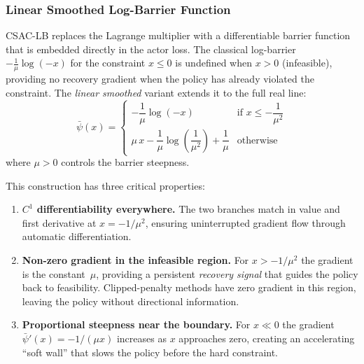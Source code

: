 \subsubsection{Linear Smoothed Log-Barrier Function}

CSAC-LB replaces the Lagrange multiplier with a differentiable barrier function
that is embedded directly in the actor loss.  The classical log-barrier
$-\frac{1}{\mu}\log(-x)$ for the constraint $x \leq 0$ is undefined when
$x > 0$ (infeasible), providing no recovery gradient when the policy has already
violated the constraint.  The \emph{linear smoothed} variant extends it to the
full real line:
\begin{equation}
  \bar{\psi}(x) =
  \begin{cases}
    -\dfrac{1}{\mu} \log(-x) & \text{if } x \leq -\dfrac{1}{\mu^2}
    \\[8pt]
    \mu\, x - \dfrac{1}{\mu}\log\!\left(\dfrac{1}{\mu^2}\right)
      + \dfrac{1}{\mu}
    & \text{otherwise}
  \end{cases}
  \label{eq:smoothed-barrier}
\end{equation}
where $\mu > 0$ controls the barrier steepness.

This construction has three critical properties:
\begin{enumerate}
  \item \textbf{$C^1$ differentiability everywhere.}  The two branches match
    in value and first derivative at $x = -1/\mu^2$, ensuring uninterrupted
    gradient flow through automatic differentiation.
  \item \textbf{Non-zero gradient in the infeasible region.}
    For $x > -1/\mu^2$ the gradient is the constant~$\mu$, providing a
    persistent \emph{recovery signal} that guides the policy back to feasibility.
    Clipped-penalty methods have zero gradient in this region, leaving the policy
    without directional information.
  \item \textbf{Proportional steepness near the boundary.}
    For $x \ll 0$ the gradient $\bar{\psi}'(x) = -1/(\mu x)$ increases as $x$
    approaches zero, creating an accelerating ``soft wall'' that slows the
    policy before the hard constraint.
\end{enumerate}

